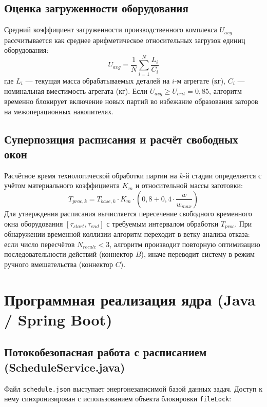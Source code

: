\documentclass[14pt, a4paper]{extarticle}
\begin{document}
\subsection{Оценка загруженности оборудования}
Средний коэффициент загруженности производственного комплекса $U_{avg}$ рассчитывается как среднее арифметическое относительных загрузок единиц оборудования:
\begin{equation}
U_{avg} = \frac{1}{N} \sum_{i=1}^{N} \frac{L_i}{C_i}
\end{equation}
где $L_i$ --- текущая масса обрабатываемых деталей на $i$-м агрегате (кг), $C_i$ --- номинальная вместимость агрегата (кг). Если $U_{avg} \ge U_{crit} = 0{,}85$, алгоритм временно блокирует включение новых партий во избежание образования заторов на межоперационных накопителях.

\subsection{Суперпозиция расписания и расчёт свободных окон}
Расчётное время технологической обработки партии на $k$-й стадии определяется с учётом материального коэффициента $K_m$ и относительной массы заготовки:
\begin{equation}
T_{proc, k} = T_{base, k} \cdot K_m \cdot \left(0{,}8 + 0{,}4 \cdot \frac{w}{w_{max}}\right)
\end{equation}
Для утверждения расписания вычисляется пересечение свободного временного окна оборудования $[\tau_{start}, \tau_{end}]$ с требуемым интервалом обработки $T_{proc}$. При обнаружении временной коллизии алгоритм переходит в ветку анализа отказа: если число пересчётов $N_{recalc} < 3$, алгоритм производит повторную оптимизацию последовательности действий (коннектор $B$), иначе переводит систему в режим ручного вмешательства (коннектор $C$).

\newpage
\section{Программная реализация ядра (Java / Spring Boot)}

\subsection{Потокобезопасная работа с расписанием (ScheduleService.java)}
Файл \texttt{schedule.json} выступает энергонезависимой базой данных задач. Доступ к нему синхронизирован с использованием объекта блокировки \texttt{fileLock}:
\end{document}
